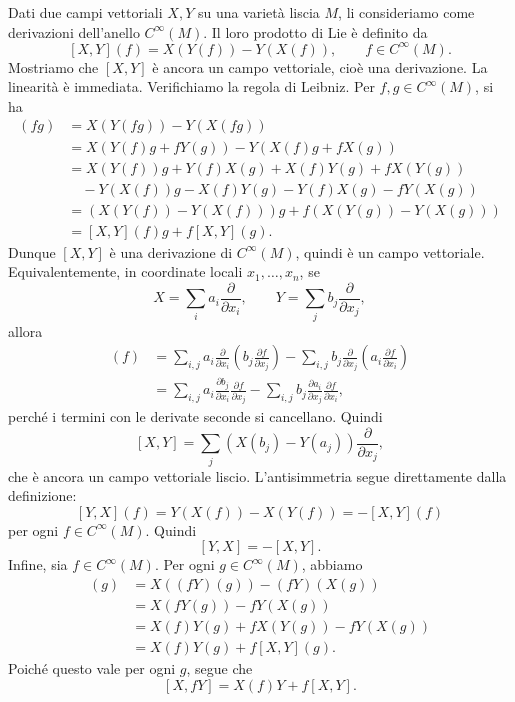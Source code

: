 \documentclass[a4paper]{article}
\begin{document}
\begin{snippetproof}{}
    Dati due campi vettoriali \(X,Y\) su una varietà liscia \(M\), li consideriamo come derivazioni dell'anello \(C^\infty(M)\). Il loro prodotto di Lie è definito da
    \[
        [X,Y](f)=X(Y(f))-Y(X(f)),
        \qquad f\in C^\infty(M).
    \]
    Mostriamo che \([X,Y]\) è ancora un campo vettoriale, cioè una derivazione. La linearità è immediata. Verifichiamo la regola di Leibniz. Per \(f,g\in C^\infty(M)\), si ha
    \begin{align*}
        [X,Y](fg)
        &=
        X(Y(fg))-Y(X(fg))\\
        &=
        X(Y(f)g+fY(g))-Y(X(f)g+fX(g))\\
        &=
        X(Y(f))g+Y(f)X(g)+X(f)Y(g)+fX(Y(g))\\
        &\quad -Y(X(f))g-X(f)Y(g)-Y(f)X(g)-fY(X(g))\\
        &=
        \left(X(Y(f))-Y(X(f))\right)g
        +
        f\left(X(Y(g))-Y(X(g))\right)\\
        &=
        [X,Y](f)g+f[X,Y](g).
    \end{align*}
    Dunque \([X,Y]\) è una derivazione di \(C^\infty(M)\), quindi è un campo vettoriale.
    Equivalentemente, in coordinate locali \(x_1,\dots,x_n\), se
    \[
        X=\sum_i a_i\frac{\partial}{\partial x_i},
        \qquad
        Y=\sum_j b_j\frac{\partial}{\partial x_j},
    \]
    allora
    \begin{align*}
        [X,Y](f)
        &=
        \sum_{i,j}a_i\frac{\partial}{\partial x_i}\left(b_j\frac{\partial f}{\partial x_j}\right)
        -
        \sum_{i,j}b_j\frac{\partial}{\partial x_j}\left(a_i\frac{\partial f}{\partial x_i}\right)\\
        &=
        \sum_{i,j}a_i\frac{\partial b_j}{\partial x_i}\frac{\partial f}{\partial x_j}
        -
        \sum_{i,j}b_j\frac{\partial a_i}{\partial x_j}\frac{\partial f}{\partial x_i},
    \end{align*}
    perché i termini con le derivate seconde si cancellano. Quindi
    \[
        [X,Y]
        =
        \sum_j
        \left(
            X(b_j)-Y(a_j)
        \right)
        \frac{\partial}{\partial x_j},
    \]
    che è ancora un campo vettoriale liscio.
    L'antisimmetria segue direttamente dalla definizione:
    \[
        [Y,X](f)
        =
        Y(X(f))-X(Y(f))
        =
        -[X,Y](f)
    \]
    per ogni \(f\in C^\infty(M)\). Quindi
    \[
        [Y,X]=-[X,Y].
    \]
    Infine, sia \(f\in C^\infty(M)\). Per ogni \(g\in C^\infty(M)\), abbiamo
    \begin{align*}
        [X,fY](g)
        &=
        X((fY)(g))-(fY)(X(g))\\
        &=
        X(fY(g))-fY(X(g))\\
        &=
        X(f)Y(g)+fX(Y(g))-fY(X(g))\\
        &=
        X(f)Y(g)+f[X,Y](g).
    \end{align*}
    Poiché questo vale per ogni \(g\), segue che
    \[
        [X,fY]=X(f)Y+f[X,Y].
    \]
\end{snippetproof}
\end{document}
